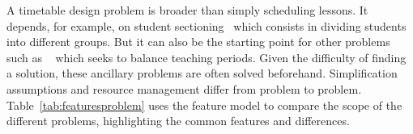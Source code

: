 

A timetable design problem is broader than simply scheduling lessons. It depends, for example, on student sectioning~\cite{2017_schindl_AOR,2004_amintoosi_patat} which consists in dividing students into different groups. But it can also be the starting point for other problems such as \BACP{}~\cite{2013_rubio_MPE,2012_chiarandini_JH} which seeks to balance teaching periods. Given the difficulty of finding a solution, these ancillary problems are often solved beforehand. %
Simplification assumptions and resource management differ from problem to problem.
Table~\ref{tab:featuresproblem} uses the feature model
to compare the scope of the different problems, highlighting the common features and differences. %


